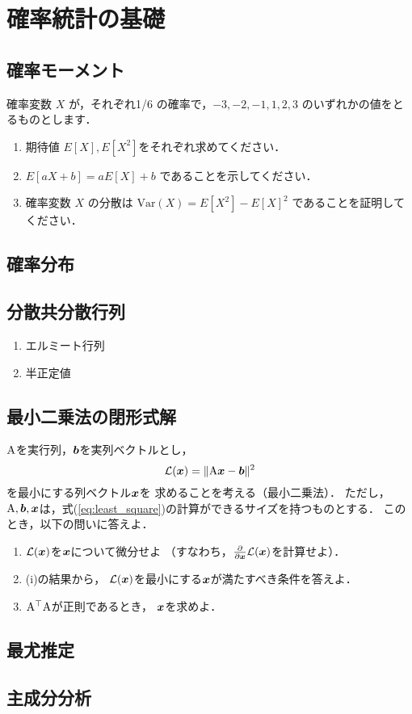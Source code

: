 \section{確率統計の基礎}

\subsection{確率モーメント}
  確率変数 $X$ が，それぞれ1/6 の確率で，$-3, -2, -1, 1, 2, 3$ のいずれかの値をとるものとします．
  \begin{enumerate}[label=(\roman*)]
    \item 期待値 $E[X], E[X^2]$をそれぞれ求めてください．
    \item $E[aX+b] = aE[X] + b$ であることを示してください．
    \item 確率変数 $X$ の分散は $\mathrm{Var}(X) = E[X^2] - E[X]^2$  であることを証明してください．
  \end{enumerate}

\subsection{確率分布}

\subsection{分散共分散行列}
  \begin{enumerate}[label=(\roman*)]
    \item エルミート行列
    \item 半正定値
  \end{enumerate}

\subsection{最小二乗法の閉形式解}
  $\mathrm{A}$を実行列，$\boldsymbol{b}$を実列ベクトルとし，
  \begin{equation}
    \mathcal{L}(\boldsymbol{x}) = \| \mathrm{A}\boldsymbol{x} - \boldsymbol{b} \|^2
    \label{eq:least_square}
  \end{equation}
  を最小にする列ベクトル$\boldsymbol{x}$を
  求めることを考える（最小二乗法）．
  ただし，$\mathrm{A}, \boldsymbol{b}, \boldsymbol{x}$は，式(\ref{eq:least_square})の計算ができるサイズを持つものとする．
  このとき，以下の問いに答えよ．
  \begin{enumerate}[label=(\roman*)]
    \item $\mathcal{L}(\boldsymbol{x})$を$\boldsymbol{x}$について微分せよ
      （すなわち，$\frac{\partial}{\partial \boldsymbol{x}} \mathcal{L}(\boldsymbol{x})$を計算せよ）．
    \item (i)の結果から，
      $\mathcal{L}(\boldsymbol{x})$を最小にする$\boldsymbol{x}$が満たすべき条件を答えよ．
    \item $\mathrm{A}^\top\mathrm{A}$が正則であるとき，
      $\boldsymbol{x}$を求めよ．
  \end{enumerate}

\subsection{最尤推定}

\subsection{主成分分析}
